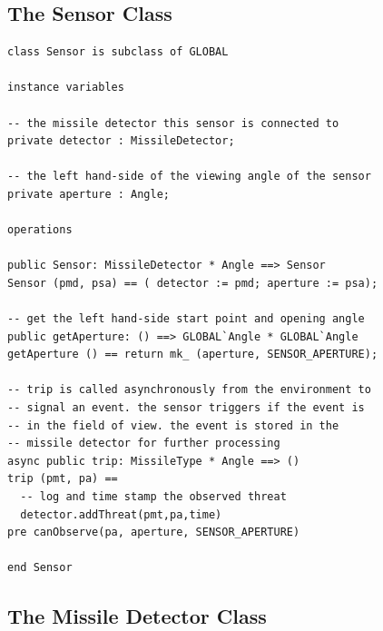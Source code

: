 \documentclass{overturerepchap}
\begin{document}
\subsection{The Sensor Class}

\begin{lstlisting}
class Sensor is subclass of GLOBAL

instance variables

-- the missile detector this sensor is connected to
private detector : MissileDetector;

-- the left hand-side of the viewing angle of the sensor
private aperture : Angle;

operations

public Sensor: MissileDetector * Angle ==> Sensor
Sensor (pmd, psa) == ( detector := pmd; aperture := psa);

-- get the left hand-side start point and opening angle
public getAperture: () ==> GLOBAL`Angle * GLOBAL`Angle
getAperture () == return mk_ (aperture, SENSOR_APERTURE);

-- trip is called asynchronously from the environment to
-- signal an event. the sensor triggers if the event is
-- in the field of view. the event is stored in the
-- missile detector for further processing
async public trip: MissileType * Angle ==> ()
trip (pmt, pa) ==
  -- log and time stamp the observed threat
  detector.addThreat(pmt,pa,time)
pre canObserve(pa, aperture, SENSOR_APERTURE)

end Sensor
\end{lstlisting}

\subsection{The Missile Detector Class}
\end{document}
